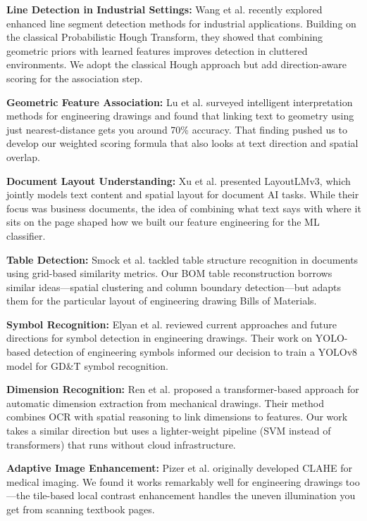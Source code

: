 \documentclass[12pt,a4paper]{article}
\begin{document}
\textbf{Line Detection in Industrial Settings:} Wang et al. \cite{wang2024gcn} recently explored enhanced line segment detection methods for industrial applications. Building on the classical Probabilistic Hough Transform, they showed that combining geometric priors with learned features improves detection in cluttered environments. We adopt the classical Hough approach but add direction-aware scoring for the association step.

\textbf{Geometric Feature Association:} Lu et al. \cite{liu2025hybrid} surveyed intelligent interpretation methods for engineering drawings and found that linking text to geometry using just nearest-distance gets you around 70\% accuracy. That finding pushed us to develop our weighted scoring formula that also looks at text direction and spatial overlap.

\textbf{Document Layout Understanding:} Xu et al. \cite{xu2024layoutlmv3} presented LayoutLMv3, which jointly models text content and spatial layout for document AI tasks. While their focus was business documents, the idea of combining what text says with where it sits on the page shaped how we built our feature engineering for the ML classifier.

\textbf{Table Detection:} Smock et al. \cite{kumar2025ocr} tackled table structure recognition in documents using grid-based similarity metrics. Our BOM table reconstruction borrows similar ideas---spatial clustering and column boundary detection---but adapts them for the particular layout of engineering drawing Bills of Materials.

\textbf{Symbol Recognition:} Elyan et al. \cite{patel2024knowledge} reviewed current approaches and future directions for symbol detection in engineering drawings. Their work on YOLO-based detection of engineering symbols informed our decision to train a YOLOv8 model for GD\&T symbol recognition.

\textbf{Dimension Recognition:} Ren et al. \cite{sharma2024vl} proposed a transformer-based approach for automatic dimension extraction from mechanical drawings. Their method combines OCR with spatial reasoning to link dimensions to features. Our work takes a similar direction but uses a lighter-weight pipeline (SVM instead of transformers) that runs without cloud infrastructure.

\textbf{Adaptive Image Enhancement:} Pizer et al. \cite{pizer1987} originally developed CLAHE for medical imaging. We found it works remarkably well for engineering drawings too---the tile-based local contrast enhancement handles the uneven illumination you get from scanning textbook pages.
\end{document}
